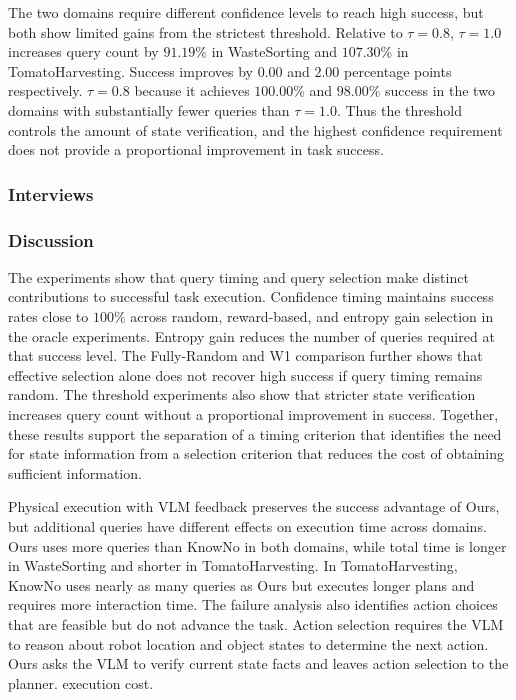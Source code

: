 The two domains require different confidence levels to reach high success, but both show limited gains from the strictest threshold. Relative to $\tau=0.8$, $\tau=1.0$ increases query count by $91.19\%$ in WasteSorting and $107.30\%$ in TomatoHarvesting. Success improves by $0.00$ and $2.00$ percentage points respectively.  $\tau=0.8$  because it achieves $100.00\%$ and $98.00\%$ success in the two domains with substantially fewer queries than $\tau=1.0$. Thus the threshold controls the amount of state verification, and the highest confidence requirement does not provide a proportional improvement in task success.

\subsubsection*{Interviews}\label{exp:interviews}


\subsubsection*{Discussion}\label{exp:discussion}

The experiments show that query timing and query selection make distinct contributions to successful task execution. Confidence timing maintains success rates close to $100\%$ across random, reward-based, and entropy gain selection in the oracle experiments. Entropy gain reduces the number of queries required at that success level. The Fully-Random and W1 comparison further shows that effective selection alone does not recover high success if query timing remains random. The threshold experiments also show that stricter state verification increases query count without a proportional improvement in success. Together, these results support the separation of a timing criterion that identifies the need for state information from a selection criterion that reduces the cost of obtaining sufficient information.

Physical execution with VLM feedback preserves the success advantage of Ours, but additional queries have different effects on execution time across domains. Ours uses more queries than KnowNo in both domains, while total time is longer in WasteSorting and shorter in TomatoHarvesting. In TomatoHarvesting, KnowNo uses nearly as many queries as Ours but executes longer plans and requires more interaction time. The failure analysis also identifies action choices that are feasible but do not advance the task. Action selection requires the VLM to reason about robot location and object states to determine the next action. Ours asks the VLM to verify current state facts and leaves action selection to the planner.  execution cost.

